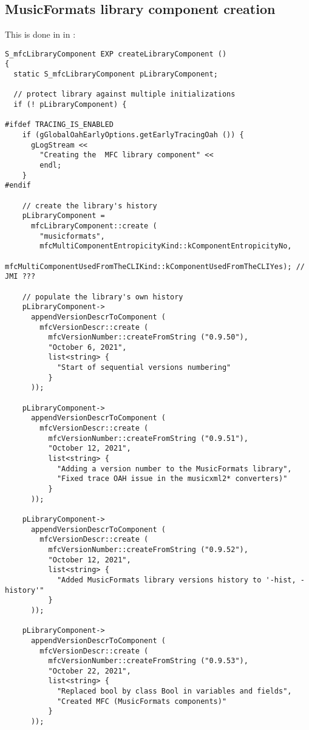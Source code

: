 \subsection{MusicFormats library component creation}\label{MusicFormats library component creation}

This is done in  in :
\begin{lstlisting}[language=CPlusPlus]
S_mfcLibraryComponent EXP createLibraryComponent ()
{
  static S_mfcLibraryComponent pLibraryComponent;

  // protect library against multiple initializations
  if (! pLibraryComponent) {

#ifdef TRACING_IS_ENABLED
    if (gGlobalOahEarlyOptions.getEarlyTracingOah ()) {
      gLogStream <<
        "Creating the  MFC library component" <<
        endl;
    }
#endif

    // create the library's history
    pLibraryComponent =
      mfcLibraryComponent::create (
        "musicformats",
        mfcMultiComponentEntropicityKind::kComponentEntropicityNo,
        mfcMultiComponentUsedFromTheCLIKind::kComponentUsedFromTheCLIYes); // JMI ???

    // populate the library's own history
    pLibraryComponent->
      appendVersionDescrToComponent (
        mfcVersionDescr::create (
          mfcVersionNumber::createFromString ("0.9.50"),
          "October 6, 2021",
          list<string> {
            "Start of sequential versions numbering"
          }
      ));

    pLibraryComponent->
      appendVersionDescrToComponent (
        mfcVersionDescr::create (
          mfcVersionNumber::createFromString ("0.9.51"),
          "October 12, 2021",
          list<string> {
            "Adding a version number to the MusicFormats library",
            "Fixed trace OAH issue in the musicxml2* converters)"
          }
      ));

    pLibraryComponent->
      appendVersionDescrToComponent (
        mfcVersionDescr::create (
          mfcVersionNumber::createFromString ("0.9.52"),
          "October 12, 2021",
          list<string> {
            "Added MusicFormats library versions history to '-hist, -history'"
          }
      ));

    pLibraryComponent->
      appendVersionDescrToComponent (
        mfcVersionDescr::create (
          mfcVersionNumber::createFromString ("0.9.53"),
          "October 22, 2021",
          list<string> {
            "Replaced bool by class Bool in variables and fields",
            "Created MFC (MusicFormats components)"
          }
      ));


\end{lstlisting}
